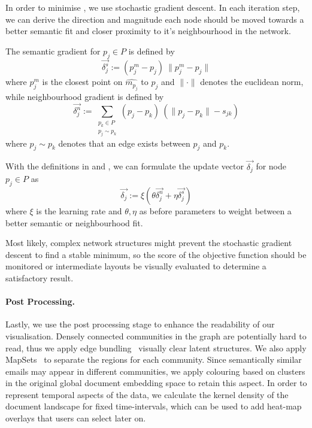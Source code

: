 In order to minimise , we use stochastic gradient descent.
In each iteration step, we can derive the direction and magnitude each node should be moved towards a better semantic fit and closer proximity to it's neighbourhood in the network.

The semantic gradient for $p_j\in P$ is defined by
\begin{equation}
\vec{\delta^s_j}:=  (p_j^m - p_j)~\lVert p_j^m - p_j\rVert
\label{eq:ds}
\end{equation}
where $p_j^m$ is the closest point on $\widehat{m_{p_j}}$ to $p_j$ and $\lVert\cdot\rVert$ denotes the euclidean norm, while neighbourhood gradient is defined by
\begin{equation}
\vec{\delta^n_j}:= \sum_{\substack{p_k\in P\\p_j\sim p_k}}(p_j - p_k)~\left(\lVert p_j - p_k\rVert - s_{jk}\right)
\label{eq:dn}
\end{equation}
where $p_j\sim p_k$ denotes that an edge exists between $p_j$ and $p_k$.

With the definitions in  and , we can formulate the update vector $\vec{\delta_j}$ for node $p_j\in P$ as
\begin{equation}
\vec{\delta_j}:=\xi\left(\theta\vec{\delta^n_j}+\eta\vec{\delta^s_j}\right)
\label{eq:dj}
\end{equation}
where $\xi$ is the learning rate and $\theta,\eta$ as before parameters to weight between a better semantic or neighbourhood fit.

Most likely, complex network structures might prevent the stochastic gradient descent to find a stable minimum, so the score of the objective function should be monitored or intermediate layouts be visually evaluated to determine a satisfactory result.

\paragraph{Post Processing.}
Lastly, we use the post processing stage to enhance the readability of our visualisation.
Densely connected communities in the graph are potentially hard to read, thus we apply edge bundling~\cite{bach2017towards} visually clear latent structures.
We also apply MapSets~\cite{efrat2015mapsets} to separate the regions for each community.
Since semantically similar emails may appear in different communities, we apply colouring based on clusters in the original global document embedding space to retain this aspect.
In order to represent temporal aspects of the data, we calculate the kernel density of the document landscape for fixed time-intervals, which can be used to add heat-map overlays that users can select later on. 

